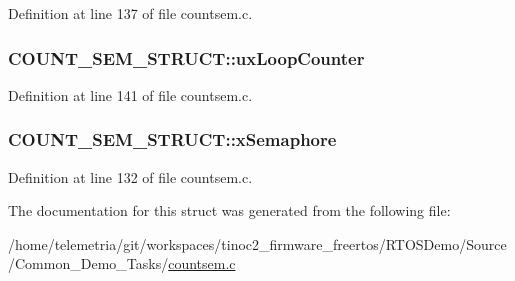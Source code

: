 Definition at line 137 of file countsem.\+c.

\subsubsection[{\texorpdfstring{ux\+Loop\+Counter}{uxLoopCounter}}]{ C\+O\+U\+N\+T\+\_\+\+S\+E\+M\+\_\+\+S\+T\+R\+U\+C\+T\+::ux\+Loop\+Counter}\hypertarget{struct_c_o_u_n_t___s_e_m___s_t_r_u_c_t_a833a25b7177bc8bc7d04d2685459213e}{}\label{struct_c_o_u_n_t___s_e_m___s_t_r_u_c_t_a833a25b7177bc8bc7d04d2685459213e}


Definition at line 141 of file countsem.\+c.

\subsubsection[{\texorpdfstring{x\+Semaphore}{xSemaphore}}]{ C\+O\+U\+N\+T\+\_\+\+S\+E\+M\+\_\+\+S\+T\+R\+U\+C\+T\+::x\+Semaphore}\hypertarget{struct_c_o_u_n_t___s_e_m___s_t_r_u_c_t_aafa3f894de13cc6a6c197790ca8d13e9}{}\label{struct_c_o_u_n_t___s_e_m___s_t_r_u_c_t_aafa3f894de13cc6a6c197790ca8d13e9}


Definition at line 132 of file countsem.\+c.



The documentation for this struct was generated from the following file\+:\begin{DoxyCompactItemize}
\item 
/home/telemetria/git/workspaces/tinoc2\+\_\+firmware\+\_\+freertos/\+R\+T\+O\+S\+Demo/\+Source/\+Common\+\_\+\+Demo\+\_\+\+Tasks/\hyperlink{countsem_8c}{countsem.\+c}\end{DoxyCompactItemize}
